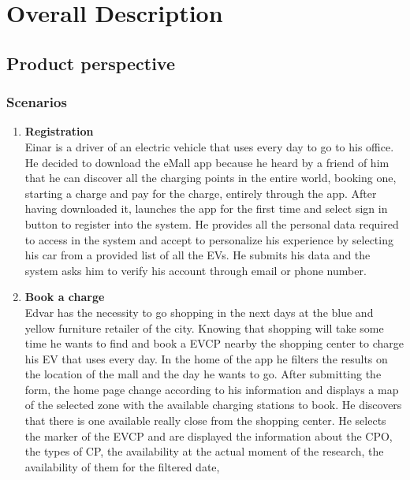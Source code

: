\section{Overall Description}

\subsection{Product perspective}
 
\subsubsection{Scenarios}
\begin{enumerate}[label=\textbf{\Alph*}.]
      \item \textbf{Registration} \\
            Einar is a driver of an electric vehicle that uses every day to go to his
            office. He decided to download the eMall app because he heard by a friend
            of him that he can discover all the charging points in the entire world,
            booking one, starting a charge and pay for the charge, entirely through
            the app. After having downloaded it, launches the app for the first time
            and select sign in button to register into the system. He provides all
            the personal data required to access in the system and accept to personalize
            his experience by selecting his car from a provided list of all the EVs.
            He submits his data and the system asks him to verify his account through email or phone number.
      \item \textbf{Book a charge} \\
            Edvar has the necessity to go shopping in the next days at the blue and yellow furniture retailer of the city. Knowing
            that shopping will take some time he wants to find and book a EVCP nearby the shopping center to charge his EV that uses every day.
            In the home of the app he filters the results on the location of the mall and the day he wants to go.
            After submitting the form, the home page change according to his information and displays
            a map of the selected zone with the available charging stations to book. He discovers that there is one available
            really close from the shopping center. He selects the marker of the EVCP and are displayed the information about the CPO,
            the types of CP, the availability at the actual moment of the research, the availability of them for the filtered date,

\end{enumerate}
